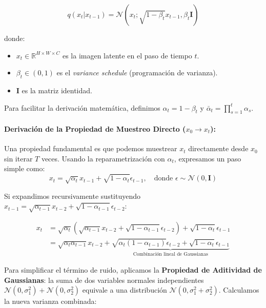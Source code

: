 \documentclass{article}
\begin{document}
\begin{equation}
    q(x_t | x_{t-1}) = \mathcal{N}(x_t; \sqrt{1-\beta_t}x_{t-1}, \beta_t \mathbf{I})
\end{equation}

\noindent donde:
\begin{itemize}
    \item $x_t \in \mathbb{R}^{H \times W \times C}$ es la imagen latente en el paso de tiempo $t$.
    \item $\beta_t \in (0, 1)$ es el \textit{variance schedule} (programación de varianza).
    \item $\mathbf{I}$ es la matriz identidad.
\end{itemize}

Para facilitar la derivación matemática, definimos $\alpha_t = 1 - \beta_t$ y $\bar{\alpha}_t = \prod_{s=1}^t \alpha_s$.

\paragraph{Derivación de la Propiedad de Muestreo Directo ($x_0 \rightarrow x_t$):}
Una propiedad fundamental es que podemos muestrear $x_t$ directamente desde $x_0$ sin iterar $T$ veces. Usando la reparametrización con $\alpha_t$, expresamos un paso simple como:
\begin{equation}
    x_t = \sqrt{\alpha_t}x_{t-1} + \sqrt{1-\alpha_t}\epsilon_{t-1}, \quad \text{donde } \epsilon \sim \mathcal{N}(0, \mathbf{I})
\end{equation}

Si expandimos recursivamente sustituyendo $x_{t-1} = \sqrt{\alpha_{t-1}}x_{t-2} + \sqrt{1-\alpha_{t-1}}\epsilon_{t-2}$:

\begin{equation}
\begin{aligned}
    x_t &= \sqrt{\alpha_t}(\sqrt{\alpha_{t-1}}x_{t-2} + \sqrt{1-\alpha_{t-1}}\epsilon_{t-2}) + \sqrt{1-\alpha_t}\epsilon_{t-1} \\
    &= \sqrt{\alpha_t \alpha_{t-1}}x_{t-2} + \underbrace{\sqrt{\alpha_t(1-\alpha_{t-1})}\epsilon_{t-2} + \sqrt{1-\alpha_t}\epsilon_{t-1}}_{\text{Combinación lineal de Gaussianas}}
\end{aligned}
\end{equation}

Para simplificar el término de ruido, aplicamos la \textbf{Propiedad de Aditividad de Gaussianas}: la suma de dos variables normales independientes $\mathcal{N}(0, \sigma_1^2) + \mathcal{N}(0, \sigma_2^2)$ equivale a una distribución $\mathcal{N}(0, \sigma_1^2 + \sigma_2^2)$. Calculamos la nueva varianza combinada:
\end{document}
